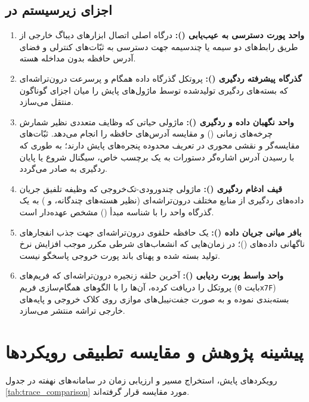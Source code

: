\subsection{اجزای زیرسیستم  در }
\begin{enumerate}
    \item \textbf{واحد پورت دسترسی به عیب‌یابی ():} درگاه اصلی اتصال ابزارهای دیباگ خارجی از طریق رابط‌های دو سیمه  یا چندسیمه  جهت دسترسی به ثبّات‌های کنترلی و فضای آدرس حافظه بدون مداخله هسته.
    \item \textbf{گذرگاه پیشرفته ردگیری ():} پروتکل گذرگاه داده همگام و پرسرعت درون‌تراشه‌ای که بسته‌های ردگیری تولیدشده توسط ماژول‌های پایش را میان اجزای گوناگون منتقل می‌سازد.
    \item \textbf{واحد نگهبان داده و ردگیری ():} ماژولی حیاتی که وظایف متعددی نظیر شمارش چرخه‌های زمانی () و مقایسه آدرس‌های حافظه را انجام می‌دهد. ثبّات‌های مقایسه‌گر  و  نقشی محوری در تعریف محدوده پنجره‌های پایش دارند؛ به طوری که با رسیدن آدرس اشاره‌گر دستورات به یک برچسب خاص، سیگنال شروع یا پایان ردگیری به  صادر می‌گردد.
    \item \textbf{قیف ادغام ردگیری ():} ماژولی چندورودی-تک‌خروجی که وظیفه تلفیق جریان داده‌های ردگیری از منابع مختلف درون‌تراشه‌ای (نظیر هسته‌های چندگانه،  و ) به یک گذرگاه واحد  را با شناسه مبدأ () مشخص عهده‌دار است.
    \item \textbf{بافر میانی جریان داده ():} یک حافظه  حلقوی درون‌تراشه‌ای جهت جذب انفجارهای ناگهانی داده‌های  ()؛ در زمان‌هایی که انشعاب‌های شرطی مکرر موجب افزایش نرخ تولید بسته شده و پهنای باند پورت خروجی پاسخگو نیست.
    \item \textbf{واحد واسط پورت ردیابی ():} آخرین حلقه زنجیره درون‌تراشه‌ای که فریم‌های پروتکل  را دریافت کرده، آن‌ها را با الگوهای همگام‌سازی فریم (بایت \texttt{0x7F}) بسته‌بندی نموده و به صورت جفت‌نیبل‌های موازی روی کلاک خروجی و پایه‌های خارجی تراشه منتشر می‌سازد.
\end{enumerate}

\section{پیشینه پژوهش و مقایسه تطبیقی رویکردها}
رویکردهای پایش، استخراج مسیر و ارزیابی زمان در سامانه‌های نهفته در جدول \ref{tab:trace_comparison} مورد مقایسه قرار گرفته‌اند.

